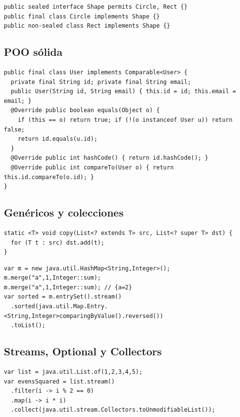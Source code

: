 \documentclass[11pt,a4paper]{article}
\begin{document}
\begin{lstlisting}[style=javastyle, caption={Clases selladas (sealed) y jerarquías cerradas}]
public sealed interface Shape permits Circle, Rect {}
public final class Circle implements Shape {}
public non-sealed class Rect implements Shape {}
\end{lstlisting}

\subsection{POO sólida}
\begin{lstlisting}[style=javastyle, caption={equals/hashCode/compareTo correctos}]
public final class User implements Comparable<User> {
  private final String id; private final String email;
  public User(String id, String email) { this.id = id; this.email = email; }
  @Override public boolean equals(Object o) {
    if (this == o) return true; if (!(o instanceof User u)) return false;
    return id.equals(u.id);
  }
  @Override public int hashCode() { return id.hashCode(); }
  @Override public int compareTo(User o) { return this.id.compareTo(o.id); }
}
\end{lstlisting}

\subsection{Genéricos y colecciones}
\begin{lstlisting}[style=javastyle, caption={PECS: Producer Extends, Consumer Super}]
static <T> void copy(List<? extends T> src, List<? super T> dst) {
  for (T t : src) dst.add(t);
}
\end{lstlisting}

\begin{lstlisting}[style=javastyle, caption={Operaciones de Map y ordenación}]
var m = new java.util.HashMap<String,Integer>();
m.merge("a",1,Integer::sum);
m.merge("a",1,Integer::sum); // {a=2}
var sorted = m.entrySet().stream()
  .sorted(java.util.Map.Entry.<String,Integer>comparingByValue().reversed())
  .toList();
\end{lstlisting}

\subsection{Streams, Optional y Collectors}
\begin{lstlisting}[style=javastyle, caption={Pipeline típico y colecciones inmutables}]
var list = java.util.List.of(1,2,3,4,5);
var evensSquared = list.stream()
  .filter(i -> i % 2 == 0)
  .map(i -> i * i)
  .collect(java.util.stream.Collectors.toUnmodifiableList());
\end{lstlisting}
\end{document}

